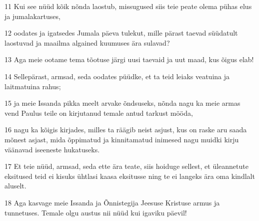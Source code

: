 \par 11 Kui see nüüd kõik nõnda laostub, missugused siis teie peate olema pühas elus ja jumalakartuses,
\par 12 oodates ja igatsedes Jumala päeva tulekut, mille pärast taevad süüdatult laostuvad ja maailma algained kuumuses ära sulavad?
\par 13 Aga meie ootame tema tõotuse järgi uusi taevaid ja uut maad, kus õigus elab!
\par 14 Sellepärast, armsad, seda oodates püüdke, et ta teid leiaks veatuina ja laitmatuina rahus;
\par 15 ja meie Issanda pikka meelt arvake õndsuseks, nõnda nagu ka meie armas vend Paulus teile on kirjutanud temale antud tarkust mööda,
\par 16 nagu ka kõigis kirjades, milles ta räägib neist asjust, kus on raske aru saada mõnest asjast, mida õppimatud ja kinnitamatud inimesed nagu muidki kirju väänavad iseeneste hukatuseks.
\par 17 Et teie nüüd, armsad, seda ette ära teate, siis hoiduge sellest, et üleannetute eksitused teid ei kisuks ühtlasi kaasa eksitusse ning te ei langeks ära oma kindlalt aluselt.
\par 18 Aga kasvage meie Issanda ja Õnnistegija Jeesuse Kristuse armus ja tunnetuses. Temale olgu austus nii nüüd kui igaviku päevil!




